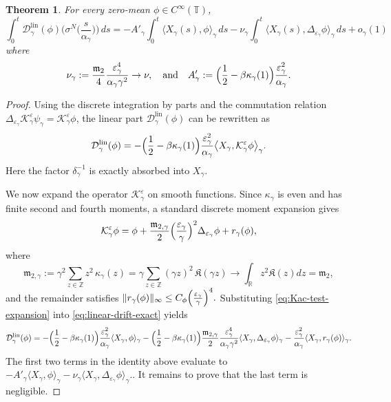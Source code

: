 \documentclass{article}
\newtheorem{theorem}{Theorem}
\begin{document}
\begin{theorem}\label{thm:expand linear part}
For every zero-mean \(\phi\in C^\infty(\mathbb T)\),
\[
\int_0^t \mathcal D_\gamma^{\mathrm{lin}}(\phi)\Big(\sigma^N\big(\frac{s}{\alpha_\gamma}\big)\Big)\,ds
=
-A'_\gamma\int_0^t\langle X_\gamma(s),\phi\rangle_\gamma\,ds
-\nu_\gamma\int_0^t\langle X_\gamma(s),\Delta_{\varepsilon_\gamma}\phi\rangle_\gamma\,ds
+o_\gamma(1)
\]
where
\[
 \nu_{\gamma} :=
\frac{\mathfrak m_{2}}{4}
\frac{\varepsilon_\gamma^4}{\alpha_\gamma\gamma^2} \to  \nu, \quad \text{and} \quad A'_\gamma := \Bigl(\frac12-\beta\kappa_\gamma(1)\Bigr)\frac{\varepsilon_\gamma^2}{\alpha_\gamma}.
\]
\end{theorem}


\begin{proof}
Using the discrete integration by parts and the commutation relation
\(\Delta_{\varepsilon_\gamma}\mathcal K_\gamma^\varepsilon\psi_\gamma
=\mathcal K_\gamma^\varepsilon\phi\), the linear part $\mathcal D_\gamma^{\mathrm{lin}}(\phi)$ can be rewritten as
\begin{equation}\label{eq:linear-drift-exact}
\mathcal D_\gamma^{\mathrm{lin}}(\phi)
=
-\Bigl(\frac12-\beta\kappa_\gamma(1)\Bigr)
\frac{\varepsilon_\gamma^2}{\alpha_\gamma}
\bigl\langle X_\gamma,\mathcal K_\gamma^\varepsilon\phi\bigr\rangle_\gamma.
\end{equation}
Here the factor \(\delta_\gamma^{-1}\) is exactly absorbed into \(X_\gamma\).

We now expand the operator \(\mathcal K_\gamma^\varepsilon\) on smooth functions.
Since \(\kappa_\gamma\) is even and has finite second and fourth moments, a standard discrete moment expansion gives
\begin{equation}
\label{eq:Kac-test-expansion}
\mathcal K_\gamma^\varepsilon\phi =\phi
+\frac{\mathfrak m_{2,\gamma}}{2}\Bigl(\frac{\varepsilon_\gamma}{\gamma}\Bigr)^2
\Delta_{\varepsilon_\gamma}\phi
+r_\gamma(\phi),
\end{equation}
where 
\[
\mathfrak m_{2,\gamma} :=
\gamma^2\sum_{z\in\mathbb Z} z^2\,\kappa_\gamma(z) = \gamma\sum_{z\in\mathbb Z}(\gamma z)^2\,\mathfrak K(\gamma z) \to \int_{\mathbb R} z^2 \mathfrak K(z) dz = \mathfrak m_2,
\]
and the remainder satisfies $\|r_\gamma(\phi)\|_\infty
\le
C_\phi\Bigl(\frac{\varepsilon_\gamma}{\gamma}\Bigr)^4.$
Substituting \eqref{eq:Kac-test-expansion} into \eqref{eq:linear-drift-exact} yields
\begin{equation}\label{eq:linear-drift-three-pieces}
    \mathcal D_\gamma^{\mathrm{lin}}(\phi) = -\Bigl(\frac12-\beta\kappa_\gamma(1)\Bigr)\frac{\varepsilon_\gamma^2}{\alpha_\gamma}
\langle X_\gamma,\phi\rangle_\gamma
\notag 
-\Bigl(\frac12-\beta\kappa_\gamma(1)\Bigr)\frac{\mathfrak m_{2,\gamma}}{2}\frac{\varepsilon_\gamma^4}{\alpha_\gamma\gamma^2}
\langle X_\gamma,\Delta_{\varepsilon_\gamma}\phi\rangle_\gamma
\notag - \frac{\varepsilon_\gamma^2}{\alpha_\gamma}
\langle X_\gamma,r_\gamma(\phi)\rangle_\gamma .
\end{equation}
The first two terms in the identity above evaluate to
\(
-A'_\gamma\langle X_\gamma,\phi\rangle_\gamma
-\nu_\gamma\langle X_\gamma,\Delta_{\varepsilon_\gamma}\phi\rangle_\gamma.
\).
It remains to prove that the last term is negligible.


\end{proof}
\end{document}

